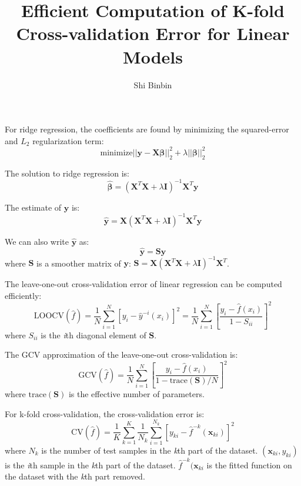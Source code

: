 \documentclass[a4paper,11pt]{article}
\title{Efficient Computation of K-fold Cross-validation Error for Linear Models}
\author{Shi Binbin}
\begin{document}
\maketitle

For ridge regression, the coefficients are found by minimizing the squared-error and  $L_2$ regularization term:
\begin{equation}
\text{minimize} ||\mathbf{y} - \mathbf{X}\boldsymbol{\beta}||_2^2 + \lambda ||\boldsymbol{\beta}||_2^2
\end{equation}

The solution to ridge regression is:
\begin{equation}
\hat{\boldsymbol{\beta}} = (\mathbf{X}^T\mathbf{X} + \lambda \mathbf{I})^{-1}\mathbf{X}^T \mathbf{y}
\end{equation}

The estimate of $\mathbf{y}$ is:
\begin{equation}
\hat{\mathbf{y}} = \mathbf{X}(\mathbf{X}^T\mathbf{X} + \lambda \mathbf{I})^{-1}\mathbf{X}^T \mathbf{y}
\end{equation}

We can also write $\hat{\mathbf{y}}$ as:
\begin{equation}
\hat{\mathbf{y}} = \mathbf{S}\mathbf{y}
\end{equation}
where $\mathbf{S}$ is a smoother matrix of $\mathbf{y}$:
$\mathbf{S} = \mathbf{X}(\mathbf{X}^T\mathbf{X} + \lambda \mathbf{I})^{-1}\mathbf{X}^T$.

The leave-one-out cross-validation error of linear regression can be computed efficiently:
\begin{equation}
\text{LOOCV}(\hat{f}) = \frac{1}{N}  \sum_{i=1}^{N}[y_i - \hat{y}^{-i}(x_i)]^2 
=  \frac{1}{N} \sum_{i=1}^{N}\left[ \frac{y_i - \hat{f}(x_i)}{1 - S_{ii}} \right]^2
\end{equation}
where $S_{ii}$ is the \textit{i}th diagonal element of $\mathbf{S}$.

The GCV approximation of the leave-one-out cross-validation is:
\begin{equation}
\text{GCV}(\hat{f}) = \frac{1}{N} \sum_{i=1}^{N} \left[\frac{y_i - \hat{f}(x_i)}{1 - \text{trace}(\mathbf{S})/N} \right]^2
\end{equation}
where $\text{trace}(\mathbf{S})$ is the effective number of parameters.

For k-fold cross-validation, the cross-validation error is:
\begin{equation}
\text{CV}(\hat{f}) = \frac{1}{K}\sum_{k=1}^K \frac{1}{N_k} \sum_{i=1}^{N_k} [y_{ki} - \hat{f}^{-k} (\mathbf{x}_{ki})]^2
\end{equation}
where $N_k$ is the number of test samples in the \textit{k}th part of the dataset.
$(\mathbf{x}_{ki}, y_{ki})$ is the \textit{i}th sample in the \textit{k}th part of the dataset.
$\hat{f}^{-k} (\mathbf{x}_{ki}$ is the fitted function on the dataset with the \textit{k}th part removed.
\end{document}
